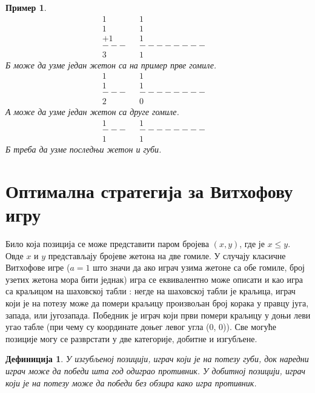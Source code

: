 \documentclass[a4paper]{article}
\newtheorem{example}{Пример}
\newtheorem{definition}{Дефиниција}
\begin{document}
\begin{example}
		\begin{align*}
			1&		&		1&\\
			1&		&       1&\\
			+1&		&  	  	1&\\
			---&	&--------&\\
			3&		&       1
		\end{align*}
	\textit{Б} може да узме један жетон са на пример прве гомиле.
		\begin{align*}
			1&		&		1&\\
			1&		&  	  	1&\\
			---&	&--------&\\
			2&		&       0
		\end{align*}
	\textit{А} може да узме један жетон са друге гомиле.
		\begin{align*}
			1&		&  	  	1&\\
			---&	&--------&\\
			1&		&       1
		\end{align*}
	\textit{Б} треба да узме последњи жетон и губи.
\end{example}

\section{Оптимална стратегија за Витхофову игру}
\label{sec:optimalna_strategija_vithof}

Било која позиција се може представити паром бројева $ (x, y) $, где је $ x \le  y $. Овде $ x $ и $ y $ представљају бројеве жетона на две гомиле. У случају класичне Витхофове игре ($ a = 1 $ што значи да ако играч узима жетоне са обе гомиле, број узетих жетона мора бити једнак) игра се еквивалентно може описати и као игра са краљицом на шаховској табли \cite{larsson2010restrictions}: негде на шаховској табли је краљица, играч који је на потезу може да помери краљицу произвољан број корака у правцу југа, запада, или југозапада. Победник је играч који први помери краљицу у доњи леви угао табле (при чему су координате доњег левог угла (0, 0)). Све могуће позиције могу се разврстати у две категорије, добитне и изгубљене.

\begin{definition}
	У изгубљеној позицији, играч који је на потезу губи, док наредни играч може да победи шта год одиграо противник. У добитној позицији, играч који је на потезу може да победи без обзира како игра противник.
\end{definition}
\end{document}
